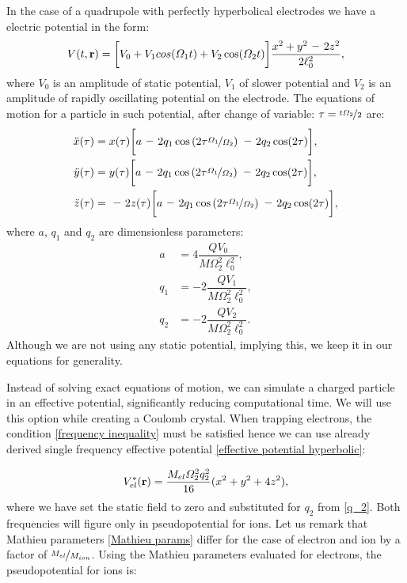 In the case of a quadrupole with perfectly hyperbolical electrodes we have a electric potential in the form:
\begin{equation}
	V(t, \vb{r}) = \bigg[ V_0 + V_1 cos(\Omega_1 t) + V_2 \cos(\Omega_2 t) \bigg] \frac{x^2 + y^2 \minus 2 z^2 }{2 \ell_0^2},
\end{equation}
where $V_0$ is an amplitude of static potential, $V_1$ of slower potential and $V_2$ is an amplitude of rapidly oscillating potential on the electrode. The equations of motion for a particle in such potential, after change of variable: $\tau = \nicefrac{t\Omega_2}{2}$ are:
\begin{subequations}
\label{eq of motion for simulation}
\begin{align}
	\ddot{x}(\tau) & = x(\tau) \bigg[ a \minus 2 q_1 \cos\left(2 \tau \nicefrac{\Omega_1}{\Omega_2} \right) \minus 2 q_2 \cos(2\tau) \bigg], \\
	\ddot{y}(\tau) & = y(\tau) \bigg[ a \minus 2 q_1 \cos\left(2 \tau \nicefrac{\Omega_1}{\Omega_2} \right) \minus 2 q_2 \cos(2\tau) \bigg], \\
	\label{studied eq of motion}
	\ddot{z}(\tau) & = \minus 2z(\tau) \bigg[ a \minus 2 q_1 \cos\left(2 \tau \nicefrac{\Omega_1}{\Omega_2} \right) \minus 2 q_2 \cos(2\tau) \bigg],
\end{align}
\end{subequations}
where $a$, $q_1$ and $q_2$ are dimensionless parameters:
\begin{subequations}
\label{Mathieu params}
\begin{align}
	\label{a}
	a & = 4 \dfrac{Q V_0}{M\Omega_2^2 \ell_0^2}, \\
	\label{q_1}
	q_1 & = \minus 2 \dfrac{Q V_1}{M\Omega_2^2 \ell_0^2}, \\
	\label{q_2}
	q_2 & = \minus 2 \dfrac{Q V_2}{M\Omega_2^2 \ell_0^2}.
\end{align}
\end{subequations}
Although we are not using any static potential, implying this, we keep it in our equations for generality.

Instead of solving exact equations of motion, we can simulate a charged particle in an effective potential, significantly reducing computational time. We will use this option while creating a Coulomb crystal. When trapping electrons, the condition \eqref{frequency inequality} must be satisfied hence we can use already derived single frequency effective potential \eqref{effective potential hyperbolic}:

\begin{equation}
	\label{electron pseudopotential}
	V_{el}^*(\vb{r}) = \frac{M_{el} \Omega_2^2 q_2^2}{16}(x^2 + y^2 + 4 z^2),
\end{equation}
where we have set the static field to zero and substituted for $q_2$ from \eqref{q_2}. Both frequencies will figure only in pseudopotential for ions. Let us remark that Mathieu parameters \eqref{Mathieu params} differ for the case of electron and ion by a factor of $\nicefrac{M_{el}}{M_{ion}}$. Using the Mathieu parameters evaluated for electrons, the pseudopotential for ions \cite{leefer2017investigation} is:


